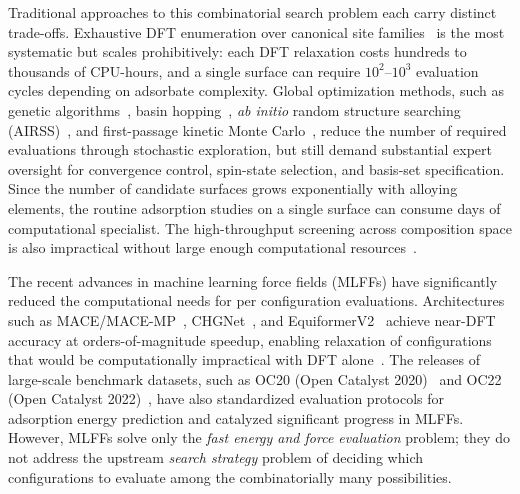 Traditional approaches to this combinatorial search problem each carry distinct trade-offs.
Exhaustive DFT enumeration over canonical site families~\cite{norskov2011density} is the most systematic but scales prohibitively: each DFT relaxation costs hundreds to thousands of CPU-hours, and a single surface can require $10^2$--$10^3$  evaluation cycles depending on adsorbate complexity.
Global optimization methods, such as genetic algorithms~\cite{vilhelmsen2014genetic}, basin hopping~\cite{wales1997global}, \emph{ab initio} random structure searching (AIRSS)~\cite{pickard2011ab}, and first-passage kinetic Monte Carlo~\cite{reuter2003first}, reduce the number of required evaluations through stochastic exploration, but still demand substantial expert oversight for convergence control, spin-state selection, and basis-set specification.
Since the number of candidate surfaces grows exponentially with alloying elements, the routine adsorption studies on a single surface can consume days of computational specialist. The high-throughput screening across composition space is also impractical without large enough computational resources~\cite{ulissi2017toward}.

The recent advances in machine learning force fields (MLFFs) have significantly reduced the computational needs for per configuration evaluations. Architectures such as MACE/MACE-MP~\cite{batatia2022mace,batatia2023foundation}, CHGNet~\cite{deng2023chgnet}, and EquiformerV2~\cite{liao2024equiformerv2} achieve near-DFT accuracy at orders-of-magnitude speedup, enabling relaxation of configurations that would be computationally impractical with DFT alone~\cite{lan2023adsorbml}. The releases of large-scale benchmark datasets, such as OC20 (Open Catalyst 2020)~\cite{chanussot2021open} and OC22 (Open Catalyst 2022)~\cite{tran2023oc22}, have also standardized evaluation protocols for adsorption energy prediction and catalyzed significant progress in MLFFs.
However, MLFFs solve only the \textit{fast energy and force evaluation} problem; they do not address the upstream \textit{search strategy} problem of deciding which configurations to evaluate among the combinatorially many possibilities.

